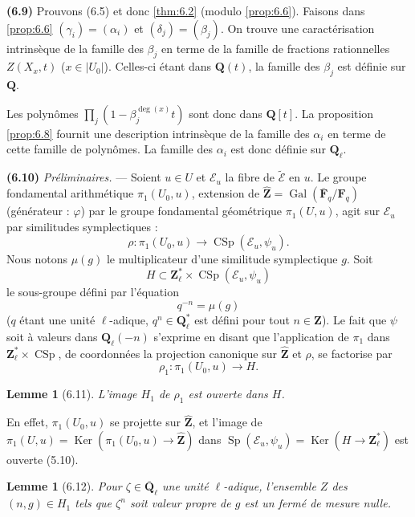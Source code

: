 \documentclass[12pt,a4paper]{amsart}
\theoremstyle{plain}
\newtheorem{lemme}[theoreme]{Lemme}
\theoremstyle{definition}
\theoremstyle{remark}
\DeclareMathOperator{\Ker}{Ker}
\DeclareMathOperator{\Gal}{Gal}
\DeclareMathOperator{\Sp}{Sp}
\DeclareMathOperator{\CSp}{CSp}
\newcommand{\Q}{\mathbf{Q}}
\newcommand{\Z}{\mathbf{Z}}
\newcommand{\F}{\mathbf{F}}
\numberwithin{equation}{section}
\begin{document}
\noindent \textbf{(6.9)} Prouvons (6.5) et donc \eqref{thm:6.2} (modulo \eqref{prop:6.6}). Faisons dans \eqref{prop:6.6} $(\gamma_i)=(\alpha_i)$ et $(\delta_j)=(\beta_j)$. On trouve une caract\'erisation intrins\`eque de la famille des $\beta_j$ en terme de la famille de fractions rationnelles $Z(X_x,t)$ ($x\in|U_0|$). Celles-ci \'etant dans $\Q(t)$, la famille des $\beta_j$ est d\'efinie sur $\Q$.

Les polyn\^omes $\prod_j(1-\beta_j^{\deg(x)} t)$ sont donc dans $\Q[t]$. La proposition \eqref{prop:6.8} fournit une description intrins\`eque de la famille des $\alpha_i$ en terme de cette famille de polyn\^omes. La famille des $\alpha_i$ est donc d\'efinie sur $\Q_\ell$.

\noindent \textbf{(6.10)} \textit{Pr\'eliminaires.} --- Soient $u\in U$ et $\mathscr{E}_u$ la fibre de $\widetilde{\mathscr{E}}$ en $u$. Le groupe fondamental arithm\'etique $\pi_1(U_0,u)$, extension de $\hat{\Z}=\Gal(\overline{\F}_q/\F_q)$ (g\'en\'erateur : $\varphi$) par le groupe fondamental g\'eom\'etrique $\pi_1(U,u)$, agit sur $\mathscr{E}_u$ par similitudes symplectiques :
\[
\rho : \pi_1(U_0,u) \longrightarrow \CSp(\mathscr{E}_u,\psi_u).
\]
Nous notons $\mu(g)$ le multiplicateur d'une similitude symplectique $g$. Soit
\[
H \subset \Z_\ell^\ast \times \CSp(\mathscr{E}_u,\psi_u)
\]
le sous-groupe d\'efini par l'\'equation
\[
q^{-n} = \mu(g)
\]
($q$ \'etant une unit\'e $\ell$-adique, $q^n\in\Q_\ell^\ast$ est d\'efini pour tout $n\in\Z$). Le fait que $\psi$ soit \`a valeurs dans $\Q_\ell(-n)$ s'exprime en disant que l'application de $\pi_1$ dans $\Z_\ell^\ast \times \CSp$, de coordonn\'ees la projection canonique sur $\hat{\Z}$ et $\rho$, se factorise par
\[
\rho_1 : \pi_1(U_0,u) \longrightarrow H.
\]

\begin{lemme}[6.11]\label{lem:6.11}
L'image $H_1$ de $\rho_1$ est ouverte dans $H$.
\end{lemme}

En effet, $\pi_1(U_0,u)$ se projette sur $\hat{\Z}$, et l'image de $\pi_1(U,u)=\Ker(\pi_1(U_0,u)\to\hat{\Z})$ dans $\Sp(\mathscr{E}_u,\psi_u)=\Ker(H\to\Z_\ell^\ast)$ est ouverte (5.10).

\begin{lemme}[6.12]\label{lem:6.12}
Pour $\zeta\in\overline{\Q}_\ell$ une unit\'e $\ell$-adique, l'ensemble $Z$ des $(n,g)\in H_1$ tels que $\zeta^n$ soit valeur propre de $g$ est un ferm\'e de mesure nulle.
\end{lemme}
\end{document}
